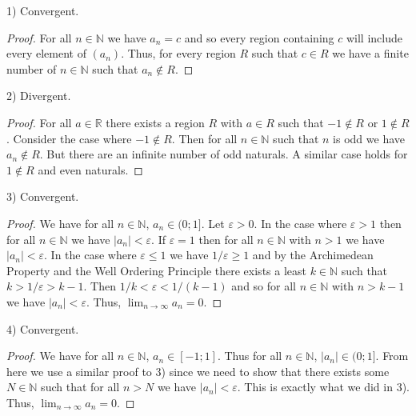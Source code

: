 \documentclass{article}
\begin{document}
\begin{flushleft}
1) Convergent.
\begin{proof}
For all $n \in \mathbb{N}$ we have $a_n = c$ and so every region containing $c$ will include every element of $(a_n)$. Thus, for every region $R$ such that $c \in R$ we have a finite number of $n \in \mathbb{N}$ such that $a_n \notin R$.
\end{proof}

2) Divergent.
\begin{proof}
For all $a \in \mathbb{R}$ there exists a region $R$ with $a \in R$ such that $-1 \notin R$ or $1 \notin R$. Consider the case where $-1 \notin R$. Then for all $n \in \mathbb{N}$ such that $n$ is odd we have $a_n \notin R$. But there are an infinite number of odd naturals. A similar case holds for $1 \notin R$ and even naturals.
\end{proof}

3) Convergent.
\begin{proof}
We have for all $n \in \mathbb{N}$, $a_n \in (0;1]$. Let $\varepsilon > 0$. In the case where $\varepsilon > 1$ then for all $n \in \mathbb{N}$ we have $|a_n| < \varepsilon$. If $\varepsilon = 1$ then for all $n \in \mathbb{N}$ with $n > 1$ we have $|a_n| < \varepsilon$. In the case where $\varepsilon \leq 1$ we have $1/\varepsilon \geq 1$ and by the Archimedean Property and the Well Ordering Principle there exists a least $k \in \mathbb{N}$ such that $k > 1/\varepsilon > k-1$. Then $1/k < \varepsilon < 1/(k-1)$ and so for all $n \in \mathbb{N}$ with $n>k-1$ we have $|a_n| < \varepsilon$. Thus, $\lim_{n \rightarrow \infty} a_n = 0$.
\end{proof}

4) Convergent.
\begin{proof}
We have for all $n \in \mathbb{N}$, $a_n \in [-1;1]$. Thus for all $n \in \mathbb{N}$, $|a_n| \in (0;1]$. From here we use a similar proof to 3) since we need to show that there exists some $N \in \mathbb{N}$ such that for all $n > N$ we have $|a_n| < \varepsilon$. This is exactly what we did in 3). Thus, $\lim_{n \rightarrow \infty} a_n = 0$.
\end{proof}


\end{flushleft}
\end{document}
